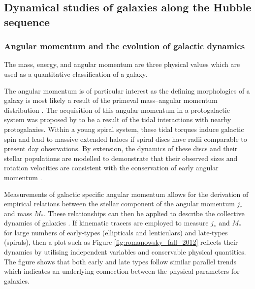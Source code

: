 \documentclass[12pt, twocolumn]{revtex4-1}    %
\begin{document}
\vspace{2ex} %
\subsection{Dynamical studies of galaxies along the Hubble sequence}
\subsubsection{Angular momentum and the evolution of galactic dynamics}
\noindent
The mass, energy, and angular momentum are three physical values which are used as a quantitative classification of a galaxy. 

The angular momentum is of particular interest as the defining morphologies of a galaxy is most likely a result of the primeval mass--angular momentum distribution \citep{1970ApJ...160..831S}. The acquisition of this angular momentum in a protogalactic system was proposed by \cite{1969ApJ...155..393P} to be a result of the tidal interactions with nearby protogalaxies. Within a young spiral system, these tidal torques induce galactic spin and lead to massive extended haloes if spiral discs have radii comparable to present day observations. By extension, the dynamics of these discs and their stellar populations are modelled to demonstrate that their observed sizes and rotation velocities are consistent with the conservation of early angular momentum \citep{1998MNRAS.295..319M, 1997ApJ...482..659D}. 

Measurements of galactic specific angular momentum allows for the derivation of empirical relations between the stellar component of the angular momentum $j_*$ and mass $M_*$. These relationships can then be applied to describe the collective dynamics of galaxies \citep{fall1983}. If kinematic tracers are employed to measure $j_*$ and $M_*$ for large numbers of early-types (ellipticals and lenticulars) and late-types (spirals), then a plot such as Figure \ref{fig:romanowsky_fall_2012} reflects their dynamics by utilising independent variables and conservable physical quantities. The figure shows that both early and late types follow similar parallel trends which indicates an underlying connection between the physical parameters for galaxies. 
\end{document}
